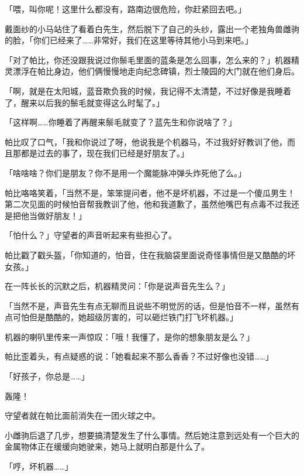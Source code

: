 「喂，叫你呢！这里什么都没有，路南边很危险，你赶紧回去吧。」

戴面纱的小马站住了看着白先生，然后脱下了自己的头纱，露出一个老独角兽雌驹的脸，「你们已经来了……非常好，我们在这里等待其他小马到来吧。」

\horizonline


「对了帕比，你还没跟我说过你鬃毛里面的蓝条是怎么回事，怎么来的？」机器精灵漂浮在帕比身边，他们俩慢慢地走向纪念碑镇，烈士陵园的大门就在他们身后。

「啊，就是在太阳城，蓝音欺负我的时候，我记得不太清楚，不过好像是我睡着了，醒来以后我的鬃毛就变得这么时髦了。」

「这样啊……你睡着了再醒来鬃毛就变了？蓝先生和你说啥了？」

帕比叹了口气，「我和你说过了呀，他说我是个机器马，不过我好好教训了他，而且那都是过去的事了，现在我们已经是好朋友了。」

「啥啥啥？你们是朋友？你不是用一个魔能脉冲弹头炸死他了么。」

帕比咯咯笑着，「当然不是，笨笨提问者，他不是坏机器，不过是一个傻瓜男生！第二次见面的时候怕音帮我教训了他，他和我道歉了，虽然他嘴巴有点毒不过我还是把他当做好朋友！」

「怕什么？」守望者的声音听起来有些担心了。

帕比戳了戳头盔，「你知道的，怕音，住在我脑袋里面说奇怪事情但是又酷酷的坏女孩。」

在一阵长长的沉默之后，机器精灵问：「你是说声音先生么？」

「当然不是，声音先生有点无聊而且说些不明觉厉的话，但是怕音不一样，虽然有点可怕但是酷酷的，她超级厉害的，可以砸烂铁门打飞坏机器。」

机器的喇叭里传来一声惊叹：「哦！我懂了，是你的想象朋友是么？」

帕比歪着头，有点疑惑的说：「她看起来不那么香香？不过好像也没错……」

「好孩子，你总是……」

轰隆！

守望者就在帕比面前消失在一团火球之中。

小雌驹后退了几步，想要搞清楚发生了什么事情。然后她注意到远处有一个巨大的金属物体正在缓缓向她驶来，她马上就明白那是什么了。

「哼，坏机器……」

\horizonline


